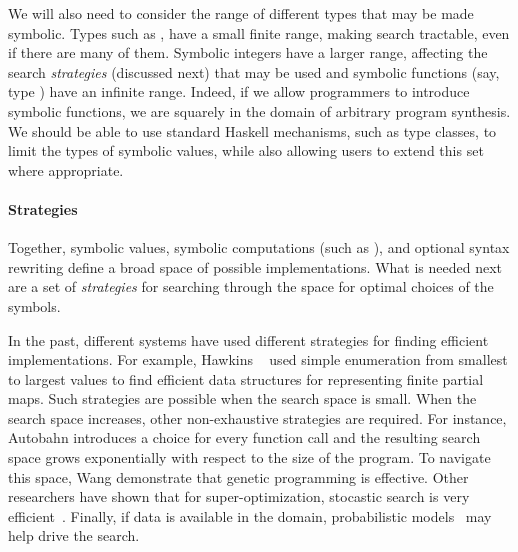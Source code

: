 We will also need to consider the range of different types that may be made symbolic.
Types such as , have a small finite range, making search tractable, even
if there are many of them.   Symbolic integers have a larger range, affecting the search
\emph{strategies} (discussed next) that may be used and symbolic functions (say, type ) have an 
infinite range.  Indeed, if we allow programmers to introduce symbolic functions, we
are squarely in the domain of arbitrary program synthesis.  We should be able to use
standard Haskell mechanisms, such as type classes, to limit the types of symbolic values,
while also allowing users to extend this set where appropriate.


\paragraph*{Strategies}
Together, symbolic values, symbolic computations (such as ),
and optional syntax rewriting define a broad space of possible
implementations.  What is needed next are a set of \emph{strategies}
for searching through the space for optimal choices of the symbols.

In the past, different systems have used different strategies for finding
efficient implementations.  For example, Hawkins \etal~\cite{data-rep-synth} used
simple enumeration from smallest to largest values to find efficient
data structures for representing finite partial maps.  Such strategies are
possible when the search space is small.  When the search space increases,
other non-exhaustive strategies are required.  For instance, Autobahn
introduces a choice for every function call and the resulting search
space grows exponentially with respect to the size of the program.  To
navigate this space, Wang \etal{} demonstrate that genetic programming is effective.
Other researchers have shown that for super-optimization, stocastic search is very
efficient~\cite{stochastic-superopt}.  Finally, if data is available in the domain, probabilistic
models~\cite{probabilistic-netkat} may help drive the search.

